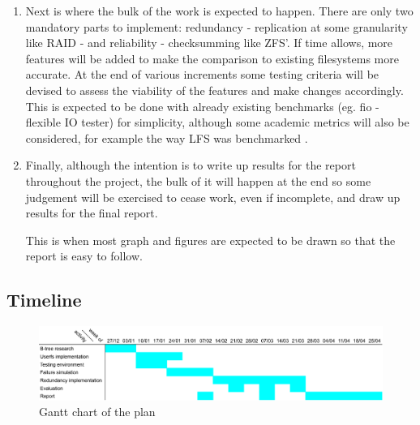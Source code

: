 \begin{enumerate}
        \item Next is where the bulk of the work is expected to happen. There
            are only two mandatory parts to implement: redundancy - replication
            at some granularity like RAID - and reliability - checksumming like
            ZFS'. If time allows, more features will be added to make the
            comparison to existing filesystems more accurate. At the end of
            various increments some testing criteria will be devised to assess
            the viability of the features and make changes accordingly. This is
            expected to be done with already existing benchmarks (eg. fio -
            flexible IO tester) for simplicity, although some academic metrics
            will also be considered, for example the way LFS was benchmarked
            \cite{LFS}.

        \item Finally, although the intention is to write up results for the
            report throughout the project, the bulk of it will happen at the
            end so some judgement will be exercised to cease work, even if
            incomplete, and draw up results for the final report.

            This is when most graph and figures are expected to be drawn so
            that the report is easy to follow.

    \label{l1_num}
    \end{enumerate}


\subsection{Timeline}


    \begin{figure}[htbp]
    	\centerline{
    		\includegraphics[width=18cm]{gantt}
    	}
    	\caption{Gantt chart of the plan}
    \end{figure}

